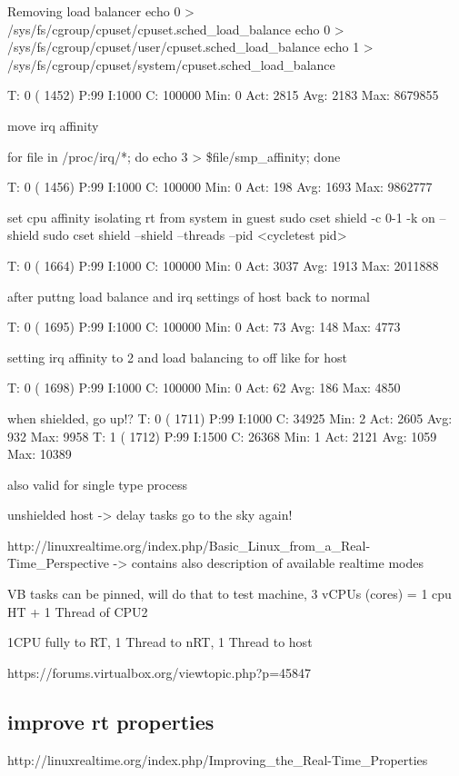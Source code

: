 \documentclass[]{scrartcl}
\begin{document}
Removing load balancer
echo 0 > /sys/fs/cgroup/cpuset/cpuset.sched_load_balance
echo 0 > /sys/fs/cgroup/cpuset/user/cpuset.sched_load_balance
echo 1 > /sys/fs/cgroup/cpuset/system/cpuset.sched_load_balance

T: 0 ( 1452) P:99 I:1000 C: 100000 Min:      0 Act: 2815 Avg: 2183 Max:  8679855

move irq affinity

for file in /proc/irq/*; do   echo 3 > \$file/smp_affinity; done

T: 0 ( 1456) P:99 I:1000 C: 100000 Min:      0 Act:  198 Avg: 1693 Max:  9862777

set cpu affinity isolating rt from system in guest
sudo cset shield -c 0-1 -k on --shield
sudo cset shield --shield --threads --pid <cycletest pid>

T: 0 ( 1664) P:99 I:1000 C: 100000 Min:      0 Act: 3037 Avg: 1913 Max:  2011888

after puttng load balance and irq settings of host back to normal

T: 0 ( 1695) P:99 I:1000 C: 100000 Min:      0 Act:   73 Avg:  148 Max:    4773

setting irq affinity to 2
and load balancing to off like for host

T: 0 ( 1698) P:99 I:1000 C: 100000 Min:      0 Act:   62 Avg:  186 Max:    4850

when shielded, go up!?
T: 0 ( 1711) P:99 I:1000 C:  34925 Min:      2 Act: 2605 Avg:  932 Max:    9958
T: 1 ( 1712) P:99 I:1500 C:  26368 Min:      1 Act: 2121 Avg: 1059 Max:   10389

also valid for single type process


unshielded host -> delay tasks go to the sky again!


http://linuxrealtime.org/index.php/Basic_Linux_from_a_Real-Time_Perspective
-> contains also description of available realtime modes


VB tasks can be pinned, will do that to test machine, 3 vCPUs (cores) = 1 cpu HT + 1 Thread of CPU2

1CPU fully to RT, 1 Thread to nRT, 1 Thread to host

https://forums.virtualbox.org/viewtopic.php?p=45847


\subsection{improve rt properties}

http://linuxrealtime.org/index.php/Improving_the_Real-Time_Properties
\end{document}
